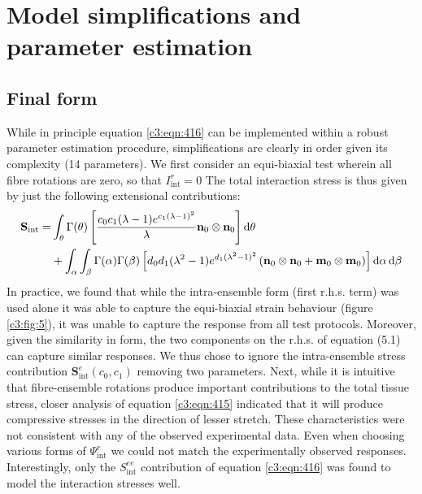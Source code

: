\section{Model simplifications and parameter estimation}

\subsection{Final form}

    While in principle equation \ref{c3:eqn:416} can be implemented within a robust parameter estimation procedure, simplifications are clearly in order given its complexity (14 parameters). We first consider an equi-biaxial test wherein all fibre rotations are zero, so that $I_\mathrm{int}^r = 0$ The total interaction stress is thus given by just the following extensional contributions:
        \begin{equation}\label{c3:eqn:51}
        \begin{aligned}
        \mathbf{S}_\mathrm{int} =&\int_\theta \Gamma(\theta)\left[\frac{c_0c_1(\lambda-1)e^{c_1(\lambda-1)^2}}{\lambda}\mathbf{n}_0\otimes\mathbf{n}_0\right]\dif \theta  \\
        &+ \int_\alpha\int_\beta \Gamma(\alpha)\Gamma(\beta)\left[d_0d_1(\lambda^2-1)e^{d_1(\lambda^2-1)^2}\left(\mathbf{n}_0\otimes\mathbf{n}_0 + \mathbf{m}_0\otimes\mathbf{m}_0\right)\right]\dif\alpha\dif\beta
        \end{aligned}
        \end{equation}
    In practice, we found that while the intra-ensemble form (first r.h.s. term) was used alone it was able to capture the equi-biaxial strain behaviour (figure \ref{c3:fig:5}), it was unable to capture the response from all test protocols. Moreover, given the similarity in form, the two components on the r.h.s. of equation (5.1) can capture similar responses. We thus chose to ignore the intra-ensemble stress contribution $\mathbf{S}_\mathrm{int}^e(c_0,c_1)$ removing two parameters. Next, while it is intuitive that fibre-ensemble rotations produce important contributions to the total tissue stress, closer analysis of equation \ref{c3:eqn:415} indicated that it will produce compressive stresses in the direction of lesser stretch. These characteristics were not consistent with any of the observed experimental data. Even when choosing various forms of $\Psi_\mathrm{int}^r$ we could not match the experimentally observed responses. Interestingly, only the $S_\mathrm{int}^{ee}$ contribution of equation \ref{c3:eqn:416} was found to model the interaction stresses well.
    

